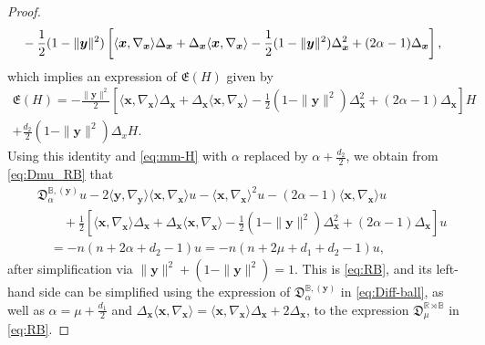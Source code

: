 \documentclass[10pt,a4paper]{amsart}
\def\BB{{\mathbb B}}
\def\RR{{\mathbb R}}
\def\a{{\alpha}}
\def\f{\frac}
\def\fD{{\mathfrak D}}
\def\fE{{\mathfrak E}}
\def\la{{\langle}}
\def\ra{{\rangle}}
\def\xb{{\bm x}}
\def\yb{{\bm y}}
\begin{document}
\begin{proof}
\begin{align}
    &\,  - \frac12 (1-\|\yb\|^2) \left[  \la \xb, \nabla_\xb \ra \Delta_\xb + \Delta_\xb \la \xb, \nabla_\xb\ra 
      - \frac 12(1-\|\yb\|^2) \Delta_\xb^2 + (2\a-1) \Delta_\xb \right], \notag
\end{align} 
which implies an expression of $\fE(H)$ given by 
\begin{align*}
\fE(H) = - \frac{\|\yb\|^2}2  \left[  \la \xb, \nabla_\xb\ra \Delta_\xb + 
    \Delta_\xb  \la \xb, \nabla_\xb\ra - \frac 12(1-\|\yb\|^2) \Delta_\xb ^2 
       + (2\a-1) \Delta_\xb  \right] H  \\
        + \f{d_2}{2} (1-\|\yb\|^2) \Delta_x  H.
\end{align*}
Using this identity and \eqref{eq:mm-H} with $\a$ replaced by $\a+ \frac{d_2}2$, we obtain from \eqref{eq:Dmu_RB} that 
\begin{align*}
& \fD_\a^{\BB, (\yb)} u  -2 \la \yb,\nabla_{\yb} \ra \la \xb,\nabla_{\xb} \ra u - \la \xb,\nabla_\xb \ra^2  u -(2\a-1) \la \xb,\nabla_\xb \ra u\\
&\qquad +  \frac{1}2  \left[  \la \xb, \nabla_\xb\ra \Delta_\xb  + \Delta_\xb  \la \xb, \nabla_\xb\ra - \frac 12(1-\|\yb\|^2) \Delta_\xb ^2 
       + (2\a-1) \Delta_\xb  \right] u \\
      &\quad  =   -n(n+2\a+d_2 -1) u= -n (n+ 2\mu + d_1+d_2-1) u,
\end{align*}
after simplification via $\|\yb\|^2 + (1-\|\yb\|^2) =1$. This is \eqref{eq:RB}, and its left-hand side can be 
simplified using the expression of $\fD_\a^{\BB, (\yb)}$ in \eqref{eq:Diff-ball}, as well as $\a = \mu + \frac{d_1}2$ and 
$\Delta_\xb \la \xb, \nabla_\xb\ra = \la \xb, \nabla_\xb\ra \Delta_\xb + 2 \Delta_\xb$, 
to the expression $\fD_\mu^{\RR \rtimes \BB}$ in \eqref{eq:RB}. 
\end{proof} 
\end{document}
